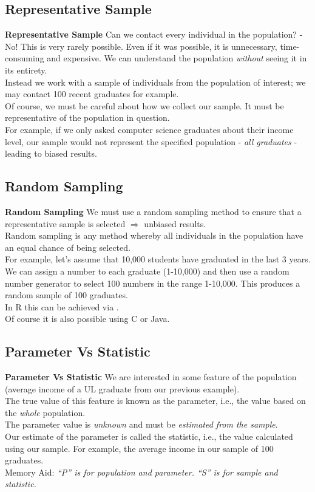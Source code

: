 \documentclass[]{report}
\begin{document}
		\subsection{Representative Sample}
		{ \textbf{Representative Sample}}
		Can we contact every individual in the population? - { No!} This is very rarely possible. Even if it was possible, it is unnecessary, time-consuming and expensive. We can understand the population \emph{without} seeing it in its entirety.\\[0.6cm]
		Instead we work with a { sample} of individuals from the population of interest; we may contact 100 recent graduates for example.\\[0.6cm]
		Of course, we must be careful about how we collect our sample. It must be { representative} of the population in question.\\[0.6cm]
		For example, if we only asked computer science graduates about their income level, our sample would not represent the specified population - \emph{all graduates} - leading to biased results.
		
		
		\subsection{Random Sampling}
		{ \textbf{Random Sampling}}
		We must use a { random sampling} method to ensure that a representative sample is selected $\Rightarrow$ { unbiased results}.\\[0.6cm]
		Random sampling is any method whereby all individuals in the population have an equal chance of being selected.\\[0.6cm]
		For example, let's assume that 10,000 students have graduated in the last 3 years. We can assign a number to each graduate (1-10,000) and then use a random number generator to select 100 numbers in the range 1-10,000. This produces a random sample of 100 graduates.\\[0.6cm]
		In R this can be achieved via .\\[0.2cm]
		Of course it is also possible using C or Java.
		
		
		
		\subsection{Parameter Vs Statistic}
		{ \textbf{Parameter Vs Statistic}}
		We are interested in some feature of the population (average income of a UL graduate from our previous example).\\[0.5cm]
		The true value of this feature is known as the { parameter}, i.e., the value based on the \emph{whole} population.\\[0.5cm]
		The parameter value is \emph{unknown} and must be \emph{estimated from the sample}.\\[0.5cm]
		Our estimate of the parameter is called the { statistic}, i.e., the value calculated using our sample. For example, the average income in our sample of 100 graduates.\\[0.7cm]
		Memory Aid: \emph{``P'' is for population and parameter.\newline
			\phantom{Memory Aid:} ``S'' is for sample and statistic.}
		
\end{document}
